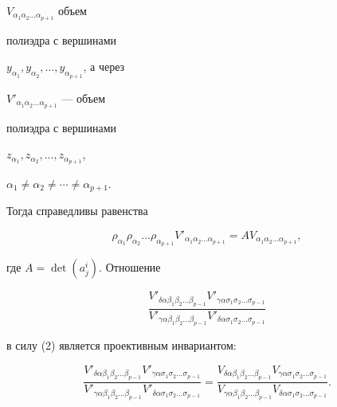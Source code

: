 $V_{\alpha_{1}\alpha_{2}\dotsc\alpha_{p+1}}$ объем


полиэдра с вершинами


$y_{\alpha_{1}}, y_{\alpha_{2}}, \dotsc, y_{\alpha_{p+1}}$, а через


$V'_{\alpha_{1}\alpha_{2}\dotsc\alpha_{p+1}}$ --- объем


полиэдра с вершинами


$z_{\alpha_{1}}, z_{\alpha_{2}}, \dotsc, z_{\alpha_{p+1}}$,


$\alpha_{1} \ne \alpha_{2} \ne \dotsb\ne \alpha_{p+1}$.


Тогда справедливы равенства


\begin{equation}


\rho_{\alpha_1} \rho_{\alpha_2} \dotsc \rho_{\alpha_{p+1}}


V'_{\alpha_{1}\alpha_{2}\dotsc\alpha_{p+1}}=


A V_{\alpha_{1}\alpha_{2}\dotsc\alpha_{p+1}},


\end{equation}


где $A=\det (a^{i}_{j})$. Отношение


$$


\frac{V'_{\delta \alpha \beta_{1} \beta_{2}\dotsc\beta_{p-1}}


V'_{\gamma \alpha \sigma_{1} \sigma_{2}\dotsc\sigma_{p-1}}}


{V'_{\gamma \alpha \beta_{1} \beta_{2}\dotsc\beta_{p-1}}


V'_{\delta \alpha \sigma_{1} \sigma_{2}\dotsc\sigma_{p-1}}}


$$


в силу (2) является проективным инвариантом:


\begin{equation}


\frac{V'_{\delta \alpha \beta_{1} \beta_{2}\dotsc\beta_{p-1}}


V'_{\gamma \alpha \sigma_{1} \sigma_{2}\dotsc\sigma_{p-1}}}


{V'_{\gamma \alpha \beta_{1} \beta_{2}\dotsc\beta_{p-1}}


V'_{\delta \alpha \sigma_{1} \sigma_{2}\dotsc\sigma_{p-1}}}=


\frac{V_{\delta \alpha \beta_{1} \beta_{2}\dotsc\beta_{p-1}}


V_{\gamma \alpha \sigma_{1} \sigma_{2}\dotsc\sigma_{p-1}}}


{V_{\gamma \alpha \beta_{1} \beta_{2}\dotsc\beta_{p-1}}


V_{\delta \alpha \sigma_{1} \sigma_{2}\dotsc\sigma_{p-1}}}.


\end{equation}





